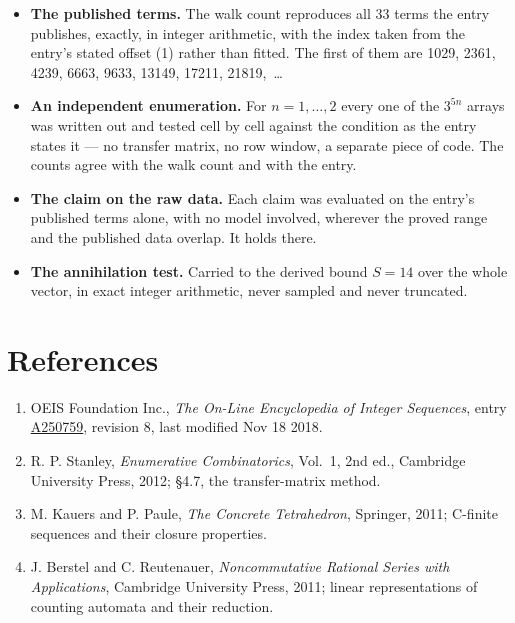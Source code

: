 \documentclass[11pt]{article}
\theoremstyle{definition}
\begin{document}
\begin{itemize}

\item {\bfseries The published terms.} The walk count reproduces all 33 terms the entry publishes, exactly, in integer arithmetic, with the index taken from the entry's stated offset (1) rather than fitted. The first of them are 1029, 2361, 4239, 6663, 9633, 13149, 17211, 21819,~\dots

\item {\bfseries An independent enumeration.} For $n = 1,\dots,2$ every one of the $3^{5n}$ arrays was written out and tested cell by cell against the condition as the entry states it --- no transfer matrix, no row window, a separate piece of code. The counts agree with the walk count and with the entry.

\item {\bfseries The claim on the raw data.} Each claim was evaluated on the entry's published terms alone, with no model involved, wherever the proved range and the published data overlap. It holds there.

\item {\bfseries The annihilation test.} Carried to the derived bound $S = 14$ over the whole vector, in exact integer arithmetic, never sampled and never truncated.

\end{itemize}

\section{References}

\begin{enumerate}

\item OEIS Foundation Inc., \emph{The On-Line Encyclopedia of Integer Sequences}, entry \href{https://oeis.org/A250759}{A250759}, revision 8, last modified Nov 18 2018.

\item R. P. Stanley, \emph{Enumerative Combinatorics}, Vol.~1, 2nd ed., Cambridge University Press, 2012; \S4.7, the transfer-matrix method.

\item M. Kauers and P. Paule, \emph{The Concrete Tetrahedron}, Springer, 2011; C-finite sequences and their closure properties.

\item J. Berstel and C. Reutenauer, \emph{Noncommutative Rational Series with Applications}, Cambridge University Press, 2011; linear representations of counting automata and their reduction.

\end{enumerate}
\end{document}
